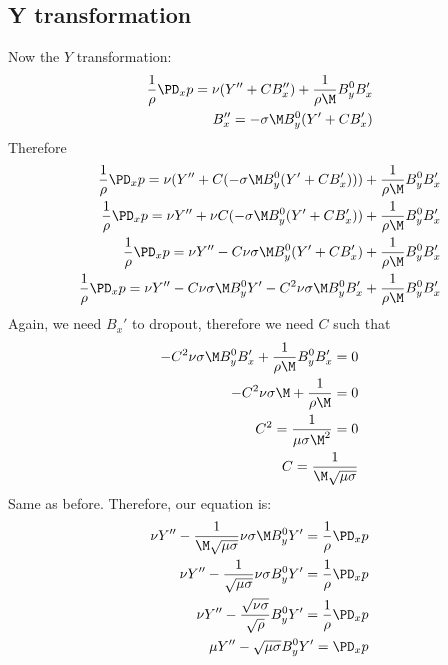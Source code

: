 \documentclass[11pt]{article}
\begin{document}
\subsection{Y transformation}
Now the $Y$ transformation:
\begin{equation}\begin{aligned}
\frac{1}{\rho}\PD_x p = \nu (Y'' + C B_x'') + \frac{1}{\rho \M} B_y^0 B_x' \\
B_x'' = - \sigma \M B_y^0 (Y' + C B_x') \\
\end{aligned} \end{equation}
Therefore
\begin{equation}\begin{aligned}
\frac{1}{\rho}\PD_x p = \nu (Y'' + C (- \sigma \M B_y^0 (Y' + C B_x'))) + \frac{1}{\rho \M} B_y^0 B_x' \\
\frac{1}{\rho}\PD_x p = \nu Y'' + \nu C (- \sigma \M B_y^0 (Y' + C B_x')) + \frac{1}{\rho \M} B_y^0 B_x' \\
\frac{1}{\rho}\PD_x p = \nu Y'' - C \nu \sigma \M B_y^0 (Y' + C B_x') + \frac{1}{\rho \M} B_y^0 B_x' \\
\frac{1}{\rho}\PD_x p = \nu Y'' - C \nu \sigma \M B_y^0 Y' - C^2 \nu \sigma \M B_y^0 B_x' + \frac{1}{\rho \M} B_y^0 B_x' \\
\end{aligned} \end{equation}
Again, we need $B_x'$ to dropout, therefore we need $C$ such that
\begin{equation}\begin{aligned}
- C^2 \nu \sigma \M B_y^0 B_x' + \frac{1}{\rho \M} B_y^0 B_x' = 0 \\
- C^2 \nu \sigma \M + \frac{1}{\rho \M} = 0 \\
C^2 = \frac{1}{\mu \sigma \M^2} = 0 \\
C = \frac{1}{\M \sqrt{\mu \sigma}} \\
\end{aligned} \end{equation}
Same as before. Therefore, our equation is:
\begin{equation}\begin{aligned}
\nu Y'' - \frac{1}{\M \sqrt{\mu \sigma}} \nu \sigma \M B_y^0 Y' = \frac{1}{\rho}\PD_x p\\
\nu Y'' - \frac{1}{\sqrt{\mu \sigma}} \nu \sigma B_y^0 Y' = \frac{1}{\rho}\PD_x p\\
\nu Y'' - \frac{\sqrt{\nu \sigma}}{\sqrt{\rho}} B_y^0 Y' = \frac{1}{\rho}\PD_x p\\
\mu Y'' - \sqrt{\mu \sigma} B_y^0 Y' = \PD_x p\\
\end{aligned} \end{equation}
\end{document}
